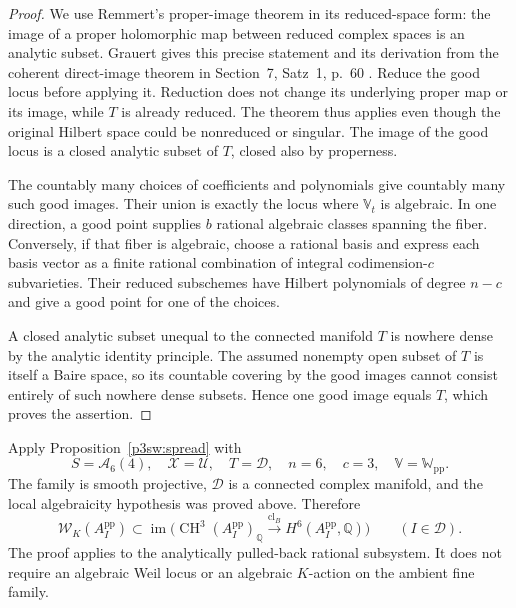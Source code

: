 \documentclass[11pt]{article}
\newcommand{\Q}{\mathbb Q}
\newcommand{\CH}{\operatorname{CH}}
\numberwithin{equation}{section}
\begin{document}
\begin{proof}
We use Remmert's proper-image theorem in its reduced-space form:
the image of a proper holomorphic map between reduced complex
spaces is an analytic subset.  Grauert gives this precise
statement and its derivation from the coherent direct-image
theorem in Section~7, Satz~1, p.~60
\cite{P3SWGrauert1960}.  Reduce the good locus before applying
it.  Reduction does not change its underlying proper map or
its image, while \(T\) is already reduced.  The theorem thus
applies even though the original Hilbert space could be
nonreduced or singular.  The image of the good locus is a
closed analytic subset of \(T\), closed also by properness.

The countably many choices of coefficients and polynomials
give countably many such good images.  Their union is exactly
the locus where \(\mathbb V_t\) is algebraic.  In one direction,
a good point supplies \(b\) rational algebraic classes spanning
the fiber.  Conversely, if that fiber is algebraic, choose a
rational basis and express each basis vector as a finite
rational combination of integral codimension-\(c\) subvarieties.
Their reduced subschemes have Hilbert polynomials of degree
\(n-c\) and give a good point for one of the choices.

A closed analytic subset unequal to the connected manifold \(T\)
is nowhere dense by the analytic identity principle.  The assumed
nonempty open subset of \(T\) is itself a Baire space, so its
countable covering by the good images cannot consist entirely of
such nowhere dense subsets.  Hence one good image equals \(T\),
which proves the assertion.
\end{proof}

Apply Proposition~\ref{p3sw:spread} with
\[
 S=\mathscr A_6(4),\quad \mathcal X=\mathscr U,\quad
 T=\mathscr D,\quad n=6,\quad c=3,\quad
 \mathbb V=\mathbb W_{\mathrm{pp}}.
\]
The family is smooth projective, \(\mathscr D\) is a connected
complex manifold, and the local algebraicity hypothesis was
proved above.  Therefore
\begin{equation}
\label{p3sw:endpoint-all-reference-periods}
 \mathcal W_K(A_I^{\mathrm{pp}})
     \subset\operatorname{im}\bigl(
        \CH^3(A_I^{\mathrm{pp}})_\Q
             \xrightarrow{\operatorname{cl}_B}
                 H^6(A_I^{\mathrm{pp}},\Q)\bigr)
       \qquad(I\in\mathscr D).
\end{equation}
The proof applies to the analytically pulled-back rational
subsystem.  It does not require an algebraic Weil locus or
an algebraic \(K\)-action on the ambient fine family.
\end{document}
